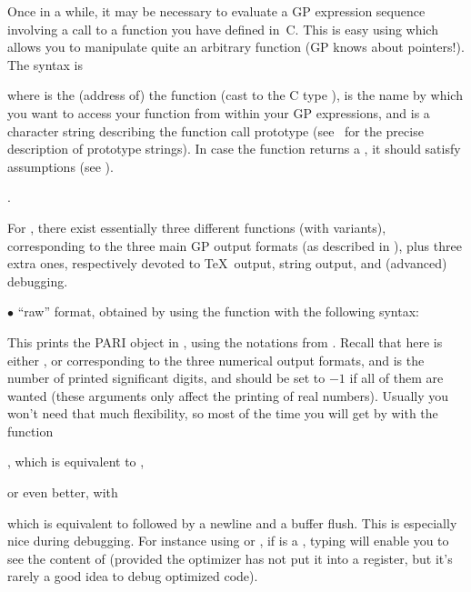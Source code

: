 Once in a while, it may be necessary to evaluate a GP expression sequence
involving a call to a function you have defined in~C. This is easy using
 which allows you to manipulate quite an arbitrary function (GP
knows about pointers!). The syntax is


\noindent where  is the (address of) the function (cast to the C type
),  is the name by which you want to access your
function from within your GP expressions, and  is a character
string describing the function call prototype (see~
for the precise description of prototype strings). In case the function
returns a , it should satisfy  assumptions (see
).

.

\noindent
For , there exist essentially three different functions (with
variants), corresponding to the three main GP output formats (as described in
), plus three extra ones, respectively devoted to
\TeX\ output, string output, and (advanced) debugging.

\noindent $\bullet$ ``raw'' format, obtained by using the function
 with the following syntax:


\noindent
This prints the PARI object  in  , using the
notations from . Recall that here  is either
,  or  corresponding to the three numerical output
formats, and  is the number of printed significant digits, and should
be set to $-1$ if all of them are wanted (these arguments only affect the
printing of real numbers). Usually you won't need that much flexibility, so
most of the time you will get by with the function

, which is equivalent to ,

\noindent or even better, with

 which is equivalent to 
followed by a newline and a buffer flush. This is especially nice during
debugging. For instance using  or , if  is a
, typing  will enable you to see the
content of  (provided the optimizer has not put it into a
register, but it's rarely a good idea to debug optimized code).

